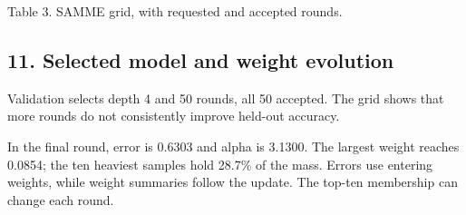 \documentclass[10pt,twocolumn,letterpaper]{article}
\begin{document}
{\centering
{}
\ifdim\wd\reporttablebox>\columnwidth
\resizebox{\columnwidth}{!}{\usebox{\reporttablebox}}
\else\usebox{\reporttablebox}\fi
\par\small Table 3. SAMME grid, with requested and accepted rounds.
\par}
\vspace{4pt}
\subsection*{11. Selected model and weight evolution}
Validation selects depth 4 and 50 rounds, all 50 accepted. The grid shows that more rounds do not consistently improve held-out accuracy.

In the final round, error is 0.6303 and alpha is 3.1300. The largest weight reaches 0.0854; the ten heaviest samples hold 28.7\% of the mass. Errors use entering weights, while weight summaries follow the update. The top-ten membership can change each round.
\end{document}
